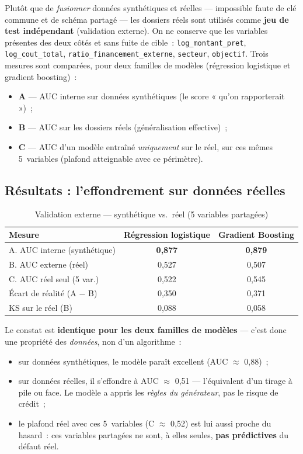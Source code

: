 \documentclass[a4paper,11pt]{report}
\begin{document}
Plutôt que de \emph{fusionner} données synthétiques et réelles — impossible faute de clé
commune et de schéma partagé — les dossiers réels sont utilisés comme \textbf{jeu de test
indépendant} (validation externe). On ne conserve que les variables présentes des deux côtés et
sans fuite de cible~: \texttt{log\_montant\_pret}, \texttt{log\_cout\_total},
\texttt{ratio\_financement\_externe}, \texttt{secteur}, \texttt{objectif}. Trois mesures sont
comparées, pour deux familles de modèles (régression logistique et gradient boosting)~:

\begin{itemize}
  \item \textbf{A} — AUC interne sur données synthétiques (le score « qu'on rapporterait »)~;
  \item \textbf{B} — AUC sur les dossiers réels (généralisation effective)~;
  \item \textbf{C} — AUC d'un modèle entraîné \emph{uniquement} sur le réel, sur ces mêmes
        5~variables (plafond atteignable avec ce périmètre).
\end{itemize}

\subsection{Résultats : l'effondrement sur données réelles}

\begin{table}[H]
\centering
\caption{Validation externe — synthétique vs.\ réel (5 variables partagées)}
\label{tab:benchmark}
\renewcommand{\arraystretch}{1.3}
\begin{tabularx}{\textwidth}{@{}Y C C@{}}
\toprule
\textbf{Mesure} & \textbf{Régression logistique} & \textbf{Gradient Boosting} \\
\midrule
A. AUC interne (synthétique) & \textbf{0{,}877} & \textbf{0{,}879} \\
B. AUC externe (réel)        & 0{,}527 & 0{,}507 \\
C. AUC réel seul (5 var.)    & 0{,}522 & 0{,}545 \\
\midrule
Écart de réalité (A $-$ B)   & 0{,}350 & 0{,}371 \\
KS sur le réel (B)           & 0{,}088 & 0{,}058 \\
\bottomrule
\end{tabularx}
\end{table}

Le constat est \textbf{identique pour les deux familles de modèles} — c'est donc une propriété
des \emph{données}, non d'un algorithme~:
\begin{itemize}
  \item sur données synthétiques, le modèle paraît excellent (AUC $\approx$ 0{,}88)~;
  \item sur données réelles, il s'effondre à AUC $\approx$ 0{,}51 — l'équivalent d'un tirage à
        pile ou face. Le modèle a appris les \emph{règles du générateur}, pas le risque de crédit~;
  \item le plafond réel avec ces 5~variables (C $\approx$ 0{,}52) est lui aussi proche du hasard~:
        ces variables partagées ne sont, à elles seules, \textbf{pas prédictives} du défaut réel.
\end{itemize}
\end{document}

